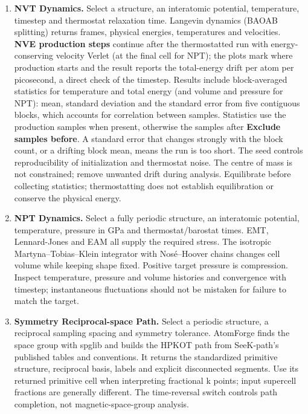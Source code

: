 \begin{enumerate}
\item \textbf{NVT Dynamics.} Select a structure, an interatomic potential, temperature, timestep and thermostat relaxation time. Langevin dynamics (BAOAB splitting) returns frames, physical energies, temperatures and velocities. \textbf{NVE production steps} continue after the thermostatted run with energy-conserving velocity Verlet (at the final cell for NPT); the plots mark where production starts and the result reports the total-energy drift per atom per picosecond, a direct check of the timestep. Results include block-averaged statistics for temperature and total energy (and volume and pressure for NPT): mean, standard deviation and the standard error from five contiguous blocks, which accounts for correlation between samples. Statistics use the production samples when present, otherwise the samples after \textbf{Exclude samples before}. A standard error that changes strongly with the block count, or a drifting block mean, means the run is too short. The seed controls reproducibility of initialization and thermostat noise. The centre of mass is not constrained; remove unwanted drift during analysis. Equilibrate before collecting statistics; thermostatting does not establish equilibration or conserve the physical energy.
\item \textbf{NPT Dynamics.} Select a fully periodic structure, an interatomic potential, temperature, pressure in GPa and thermostat/barostat times. EMT, Lennard-Jones and EAM all supply the required stress. The isotropic Martyna--Tobias--Klein integrator with Nos\'e--Hoover chains changes cell volume while keeping shape fixed. Positive target pressure is compression. Inspect temperature, pressure and volume histories and convergence with timestep; instantaneous fluctuations should not be mistaken for failure to match the target.
\item \textbf{Symmetry Reciprocal-space Path.} Select a periodic structure, a reciprocal sampling spacing and symmetry tolerance. AtomForge finds the space group with spglib and builds the HPKOT path from SeeK-path's published tables and conventions. It returns the standardized primitive structure, reciprocal basis, labels and explicit disconnected segments. Use its returned primitive cell when interpreting fractional k points; input supercell fractions are generally different. The time-reversal switch controls path completion, not magnetic-space-group analysis.
\end{enumerate}


